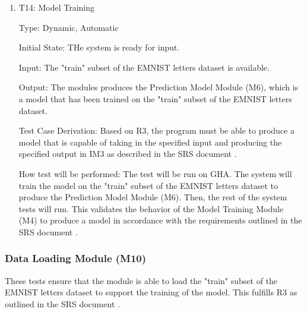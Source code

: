 \documentclass[12pt, titlepage]{article}
\begin{document}
\begin{enumerate}

\item{T14: Model Training\\}

Type: Dynamic, Automatic
					
Initial State: THe \progname{} system is ready for input.
					
Input: The "train" subset of the EMNIST letters dataset is available.
					
Output: The modules produces the Prediction Model Module (M6), which is a model
that has been trained on the "train" subset of the EMNIST letters dataset. 

Test Case Derivation: Based on R3, the program must be able to produce a model
that is capable of taking in the specified input and producing the specified
output in IM3 as described in the SRS document \citep{SRS}.

How test will be performed: The test will be run on GHA. The system will train
the model on the "train" subset of the EMNIST letters dataset to produce the
Prediction Model Module (M6). Then, the rest of the system tests will run. This
validates the behavior of the Model Training Module (M4) to produce a model
in accordance with the requirements outlined in the SRS document \citep{SRS}.

\end{enumerate}

\subsubsection{Data Loading Module (M10)}

These tests ensure that the module is able to load the "train" subset of the
EMNIST letters dataset to support the training of the model. This fulfills R3 as
outlined in the SRS document \citep{SRS}.
\end{document}

